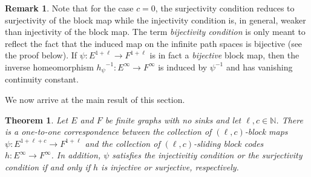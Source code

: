\documentclass[12pt,a4paper,oneside,reqno,final]{amsart}
\newcommand{\LRA}{\longrightarrow}
\newcommand{\N}{\mathbb{N}}
\newtheorem{theorem}[lemma]{Theorem}
\theoremstyle{definition}
\newtheorem{remark}[lemma]{Remark}
\numberwithin{equation}{section} %
\begin{document}
\begin{remark}
    Note that for the case $c = 0$, the surjectivity condition reduces to surjectivity of the block map
    while the injectivity condition is, in general, weaker than injectivity of the block map.
    The term \emph{bijectivity condition} is only meant to reflect the fact that the induced map on the infinite path spaces is bijective (see the proof below).
    If $\psi\colon E^{1 + \ell} \LRA F^{1 + \ell}$ is in fact a \emph{bijective} block map,
    then the inverse homeomorphism ${h_\psi}^{-1}\colon E^\infty \LRA F^\infty$ is induced by $\psi^{-1}$
    and has vanishing continuity constant.
\end{remark}


We now arrive at the main result of this section.

\begin{theorem}\label{thm:1:1}
    Let $E$ and $F$ be finite graphs with no sinks and let $\ell, c\in \N$.
    There is a one-to-one correspondence between the collection of $(\ell, c)$-block maps $\psi\colon E^{1 + \ell + c}\LRA F^{1 + \ell}$ 
    and the collection of $(\ell, c)$-sliding block codes $h\colon E^\infty\LRA F^\infty$.
    In addition, $\psi$ satisfies the injectivitiy condition or the surjectivity condition
    if and only if $h$ is injective or surjective, respectively.
\end{theorem}
\end{document}
